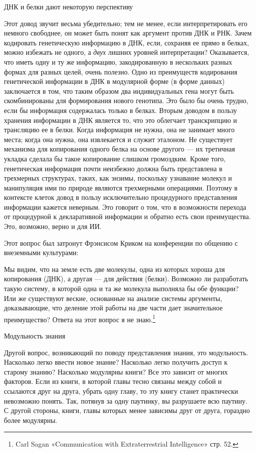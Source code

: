 \documentclass[../main.tex]{subfiles}
\begin{document}
ДНК и белки дают некоторую перспективу

Этот довод звучит весьма убедительно; тем не менее, если интерпретировать его немного свободнее, он может быть понят как аргумент против ДНК и РНК. Зачем кодировать генетическую информацию в ДНК, если, сохраняя ее прямо в белках, можно избежать не одного, а \emph{двух} лишних уровней интерпретации? Оказывается, что иметь одну и ту же информацию, закодированную в нескольких разных формах для разных целей, очень полезно. Одно из преимуществ кодирования генетической информации в ДНК в модулярной форме (в форме данных) заключается в том, что таким образом два индивидуальных гена могут быть скомбинированы для формирования нового генотипа. Это было бы очень трудно, если бы информация содержалась только в белках. Вторым доводом в пользу хранения информации в ДНК является то, что это облегчает транскрипцию и трансляцию ее в белки. Когда информация не нужна, она не занимает много места; когда она нужна, она извлекается и служит эталоном. Не существует механизма для копирования одного белка на основе другого --- их третичная укладка сделала бы такое копирование слишком громоздким. Кроме того, генетическая информация почти неизбежно должна быть представлена в трехмерных структурах, таких, как энзимы, поскольку узнавание молекул и манипуляция ими по природе являются трехмерными операциями. Поэтому в контексте клеток довод в пользу исключительно процедурного представления информации кажется неверным. Это говорит о том, что в возможности перехода от процедурной к декларативной информации и обратно есть свои преимущества. Это, возможно, верно и для ИИ.

Этот вопрос был затронут Фрэнсисом Криком на конференции по общению с внеземными культурами:

Мы видим, что на земле есть две молекулы, одна из которых хороша для копирования (ДНК), а другая --- для действия (белки). Возможно ли разработать такую систему, в которой одна и та же молекула выполняла бы обе функции? Или же существуют веские, основанные на анализе системы аргументы, доказывающие, что деление этой работы на две части дает значительное преимущество? Ответа на этот вопрос я не знаю.\footnote{Carl Sagan «Communication with Extraterrestrial Intelligence» стр. 52.}

Модульность знания

Другой вопрос, возникающий по поводу представления знания, это модульность. Насколько легко ввести новое знание? Насколько легко получить доступ к старому знанию? Насколько модулярны книги? Все это зависит от многих факторов. Если из книги, в которой главы тесно связаны между собой и ссылаются друг на друга, убрать одну главу, то эту книгу станет практически невозможно понять. Так, потянув за одну паутинку, вы разрушаете всю паутину. С другой стороны, книги, главы которых менее зависимы друг от друга, гораздно более модулярны.
\end{document}
